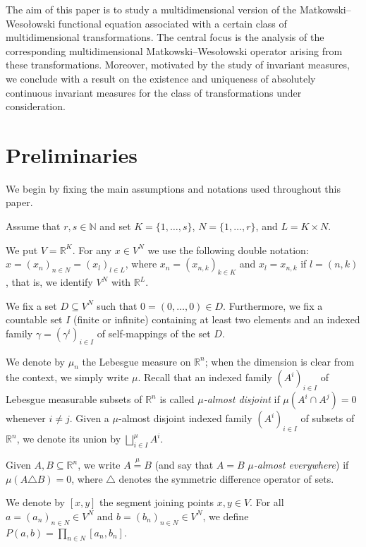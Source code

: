 \documentclass{amsart}
\theoremstyle{plain}%
\theoremstyle{definition}
\theoremstyle{remark}
\newcommand{\meq}{\mathop{=}\limits^{\mu}}
\begin{document}
The aim of this paper is to study a multidimensional version of the Matkowski--Wesołowski functional equation associated with a certain class of multidimensional transformations. The central focus is the analysis of the corresponding multidimensional Matkowski--Wesołowski operator arising from these transformations. Moreover, motivated by the study of invariant measures, we conclude with a result on the existence and uniqueness of absolutely continuous invariant measures for the class of transformations under consideration.


\section{Preliminaries}\label{section2}
We begin by fixing the main assumptions and notations used throughout this paper.

Assume that $r,s\in\mathbb N$ and set $K=\{1,\ldots,s\}$, $N=\{1,\ldots,r\}$, and $L=K\times N$.

We put $V=\mathbb R^K$. For any $x\in V^N$ we use the following double notation: $x=(x_n)_{n\in N }= (x_l)_{l\in L}$, where $x_n=(x_{n,k})_{k\in K}$ and $x_l=x_{n,k}$ if $l=(n,k)$, that is, we identify $V^N$ with $\mathbb{R}^L$. 

We fix a set $D\subseteq V^N$ such that $0=(0,\ldots,0)\in D$. Furthermore, we fix a countable set $I$ (finite or infinite) containing at least two elements and an indexed family $\gamma=(\gamma^i)_{i\in I}$ of self-mappings of the set $D$.

We denote by $\mu_n$ the Lebesgue measure on $\mathbb{R}^n$; when the dimension is clear from the context, we simply write $\mu$.
Recall that an indexed family $(A^i)_{i\in I}$ of Lebesgue measurable subsets of $\mathbb R^n$ is called \emph{$\mu$\nobreakdash-almost disjoint} if $\mu(A^i\cap A^j)=0$ whenever $i\neq j$. Given a $\mu$\nobreakdash-almost disjoint indexed family $(A^i)_{i\in I}$ of subsets of $\mathbb R^n$, we denote its union by $\bigsqcup_{i\in I}^\mu A^i$.	

Given $A,B\subseteq\mathbb R^n$, we write $A\meq B$ (and say that $A=B$ \emph{$\mu$\nobreakdash-almost everywhere}) if $\mu(A\triangle B)=0$, where $\triangle $ denotes the symmetric difference operator of sets.

We denote by $[x,y]$ the segment joining points $x,y\in V$. For all $a=(a_n)_{n\in N}\in V^N$ and $b=(b_n)_{n\in N}\in V^N$, we define $P(a,b)=\prod_{n\in N}[a_n,b_n]$.
\end{document}
